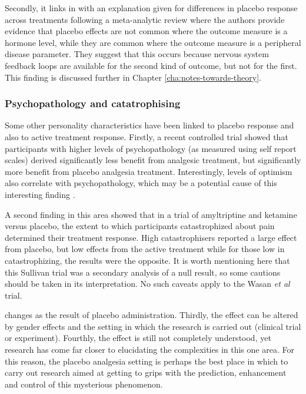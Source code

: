Secondly, it links in with an explanation given for differences in placebo response across treatments following a meta-analytic review \cite{Meissner2007} where the authors provide evidence that placebo effects are not common where the outcome measure is a hormone level, while they are common where the outcome measure is a peripheral disease parameter. They suggest that this occurs because nervous system feedback loops are available for the second kind of outcome, but not for the first. This finding is discussed further in Chapter \ref{cha:notes-towards-theory}.  

\subsubsection{Psychopathology and catatrophising}
\label{sec:psych-catatr}



Some other personality characteristics have been linked to placebo response and also to active treatment response. Firstly, a recent controlled trial \cite{Wasan2005}  showed that participants with higher levels of psychopathology (as measured using self report scales) derived significantly less benefit from analgesic treatment, but significantly more benefit from placebo analgesia treatment. Interestingly, levels of optimism also correlate with psychopathology, which may be a potential cause of this interesting finding \cite{Carver2010}.  

A second finding in this area \cite{Sullivan2008}  showed that in a trial of amyltriptine and ketamine versus placebo, the extent to which participants catastrophized about pain determined their treatment response. High catastrophisers reported a large effect from placebo, but low effects from the active treatment while for those low in catastrophizing, the results were the opposite. It is worth mentioning here that this Sullivan trial was a secondary analysis of a null result, so some cautions should be taken in its interpretation. No such caveats apply to the Wasan \textit{et al} trial. 


changes as the result of placebo administration.  Thirdly, the effect can be altered by gender effects and the setting in which the research is carried out (clinical trial or experiment). Fourthly, the effect is still not completely understood, yet research has come far closer to elucidating the complexities in this one area. For this reason, the placebo analgesia setting is perhaps the best place in which to carry out research aimed at getting to grips with the prediction, enhancement and control of this mysterious phenomenon. 


